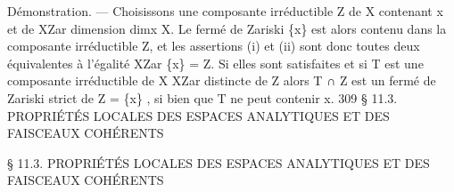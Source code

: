 \documentclass[
  10pt,
]{article}
\newenvironment{Shaded}{}{}
\newcommand{\NormalTok}[1]{#1}
\begin{document}
\begin{Shaded}
\begin{Highlighting}[]
\NormalTok{Démonstration. — Choisissons une composante irréductible Z de X contenant x et de}
\NormalTok{                                                 XZar}
\NormalTok{dimension dimx X. Le fermé de Zariski \{x\}             est alors contenu dans la composante}
\NormalTok{irréductible Z, et les assertions (i) et (ii) sont donc toutes deux équivalentes à l’égalité}
\NormalTok{    XZar}
\NormalTok{\{x\}      = Z. Si elles sont satisfaites et si T est une composante irréductible de X}
\NormalTok{                                                                         XZar}
\NormalTok{distincte de Z alors T ∩ Z est un fermé de Zariski strict de Z = \{x\}          , si bien que T}
\NormalTok{ne peut contenir x.}
\NormalTok{                                                                             309}
\NormalTok{ § 11.3. PROPRIÉTÉS LOCALES DES ESPACES ANALYTIQUES ET DES FAISCEAUX COHÉRENTS}

\NormalTok{  § 11.3. PROPRIÉTÉS LOCALES DES ESPACES ANALYTIQUES ET}
\NormalTok{                    DES FAISCEAUX COHÉRENTS}


\end{Highlighting}
\end{Shaded}
\end{document}
